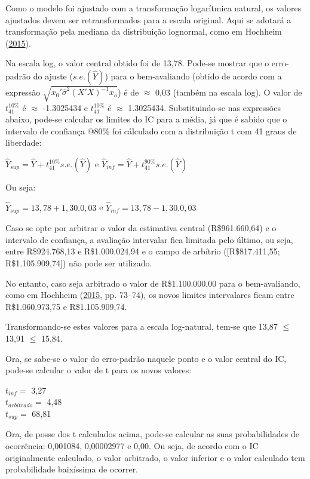 \documentclass[a4paper, 12pt]{article}
\begin{document}
Como o modelo foi ajustado com a transformação logarítmica natural, os
valores ajustados devem ser retransformados para a escala original. Aqui
se adotará a transformação pela mediana da distribuição lognormal, como
em Hochheim (\protect\hyperlink{ref-hochheim}{2015}).

Na escala log, o valor central obtido foi de 13,78. Pode-se mostrar que
o erro-padrão do ajuste (\(s.e.(\hat Y)\)) para o bem-avaliando (obtido
de acordo com a expressão \(\sqrt{x_0'\hat\sigma^2(X'X)^{-1}x_o}\)) é de
\(\approx\) 0,03 (também na escala log). O valor de \(t_{41}^{10\%}\) é
\(\approx\) -1.3025434 e \(t_{41}^{10\%}\) é \(\approx\) 1.3025434.
Substituindo-se nas expressões abaixo, pode-se calcular os limites do IC
para a média, já que é sabido que o intervalo de confiança @80\% foi
cálculado com a distribuição t com 41 graus de liberdade:

\(\hat Y_{sup} = \hat Y + t_{41}^{10\%}s.e.(\hat Y)\) e
\(\hat Y_{inf} = \hat Y + t_{41}^{90\%}s.e.(\hat Y)\)

Ou seja:

\(\hat Y_{sup} = 13,78 + 1,30.0,03\) e
\(\hat Y_{inf} = 13,78 - 1,30.0,03\)

Caso se opte por arbitrar o valor da estimativa central (R\$961.660,64)
e o intervalo de confiança, a avaliação intervalar fica limitada pelo
último, ou seja, entre R\$924.768,13 e R\$1.000.024,94 e o campo de
arbítrio ({[}R\$817.411,55; R\$1.105.909,74{]}) não pode ser utilizado.

No entanto, caso seja arbitrado o valor de R\$1.100.000,00 para o
bem-avaliando, como em Hochheim (\protect\hyperlink{ref-hochheim}{2015},
pp. 73--74), os novos limites intervalares ficam entre R\$1.060.973,75 e
R\$1.105.909,74.

Transformando-se estes valores para a escala log-natural, tem-se que
13,87 \(\leq\) 13,91 \(\leq\) 15,84.

Ora, se sabe-se o valor do erro-padrão naquele ponto e o valor central
do IC, pode-se calcular o valor de t para os novos valores:

\(t_{inf} =\) 3,27\\
\(t_{arbitrado} =\) 4,48\\
\(t_{sup} =\) 68,81

Ora, de posse dos t calculados acima, pode-se calcular as suas
probabilidades de ocorrência: 0,001084, 0,00002977 e 0,00. Ou seja, de
acordo com o IC originalmente calculado, o valor arbitrado, o valor
inferior e o valor calculado tem probabilidade baixíssima de ocorrer.
\end{document}
